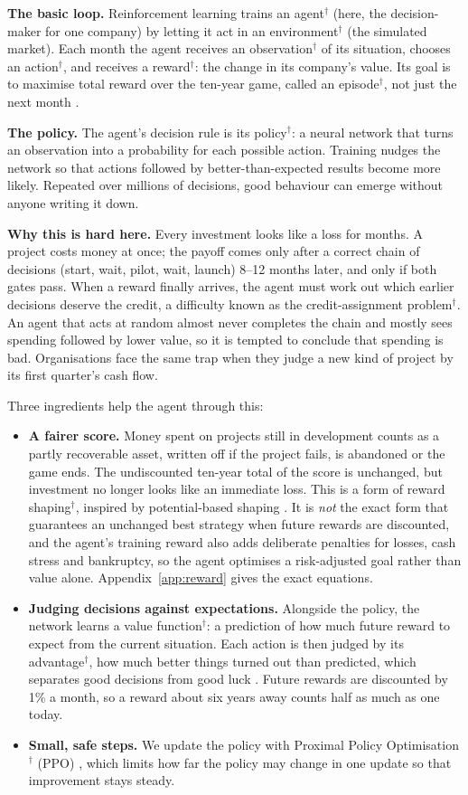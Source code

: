 \documentclass[11pt]{article}
\newcommand{\gl}[1]{#1\hyperref[app:glossary]{$^{\dagger}$}}
\begin{document}
\textbf{The basic loop.} Reinforcement learning trains an \gl{agent} (here, the decision-maker for one company) by letting it act in an \gl{environment} (the simulated market). Each month the agent receives an \gl{observation} of its situation, chooses an \gl{action}, and receives a \gl{reward}: the change in its company's value. Its goal is to maximise total reward over the ten-year game, called an \gl{episode}, not just the next month \citep{sutton2018rl}.

\textbf{The policy.} The agent's decision rule is its \gl{policy}: a neural network that turns an observation into a probability for each possible action. Training nudges the network so that actions followed by better-than-expected results become more likely. Repeated over millions of decisions, good behaviour can emerge without anyone writing it down.

\textbf{Why this is hard here.} Every investment looks like a loss for months. A project costs money at once; the payoff comes only after a correct chain of decisions (start, wait, pilot, wait, launch) 8--12 months later, and only if both gates pass. When a reward finally arrives, the agent must work out which earlier decisions deserve the credit, a difficulty known as the \gl{credit-assignment problem}. An agent that acts at random almost never completes the chain and mostly sees spending followed by lower value, so it is tempted to conclude that spending is bad. Organisations face the same trap when they judge a new kind of project by its first quarter's cash flow.

Three ingredients help the agent through this:
\begin{itemize}
  \item \textbf{A fairer score.} Money spent on projects still in development counts as a partly recoverable asset, written off if the project fails, is abandoned or the game ends. The undiscounted ten-year total of the score is unchanged, but investment no longer looks like an immediate loss. This is a form of \gl{reward shaping}, inspired by potential-based shaping \citep{ng1999shaping}. It is \emph{not} the exact form that guarantees an unchanged best strategy when future rewards are discounted, and the agent's training reward also adds deliberate penalties for losses, cash stress and bankruptcy, so the agent optimises a risk-adjusted goal rather than value alone. Appendix~\ref{app:reward} gives the exact equations.
  \item \textbf{Judging decisions against expectations.} Alongside the policy, the network learns a \gl{value function}: a prediction of how much future reward to expect from the current situation. Each action is then judged by its \gl{advantage}, how much better things turned out than predicted, which separates good decisions from good luck \citep{schulman2016gae}. Future rewards are discounted by 1\% a month, so a reward about six years away counts half as much as one today.
  \item \textbf{Small, safe steps.} We update the policy with \gl{Proximal Policy Optimisation} (PPO) \citep{schulman2017ppo}, which limits how far the policy may change in one update so that improvement stays steady.
\end{itemize}
\end{document}
